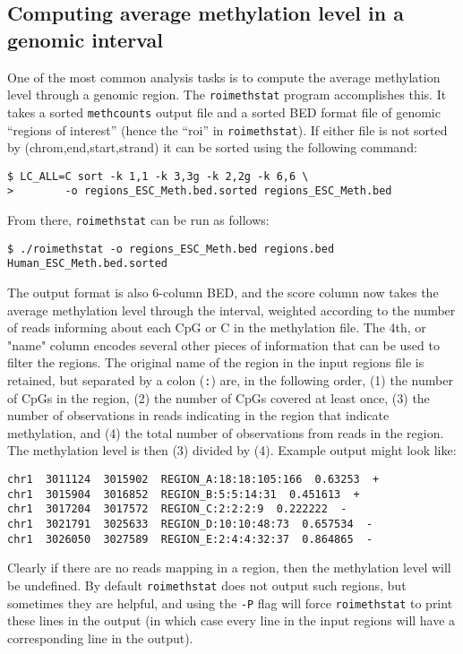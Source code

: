 \documentclass[10pt]{article}
\newcommand{\prog}[1]{\texttt{#1}}
\newcommand{\lit}[1]{\texttt{#1}}
\newcommand{\op}[1]{\texttt{#1}}
\begin{document}

\subsection{Computing average methylation level in a genomic interval}
\label{sec:roimethstat}

One of the most common analysis tasks is to compute the average
methylation level through a genomic region. The \prog{roimethstat}
program accomplishes this. It takes a sorted \prog{methcounts} output file
and a sorted BED format file of genomic ``regions of interest'' (hence the
``roi'' in \prog{roimethstat}).  If either file is not sorted by (chrom,end,start,strand)
it can be sorted using the following command:
\begin{verbatim}
$ LC_ALL=C sort -k 1,1 -k 3,3g -k 2,2g -k 6,6 \
>        -o regions_ESC_Meth.bed.sorted regions_ESC_Meth.bed
\end{verbatim}
From there, \prog{roimethstat} can be run as follows:
\begin{verbatim}
$ ./roimethstat -o regions_ESC_Meth.bed regions.bed Human_ESC_Meth.bed.sorted
\end{verbatim}
The output format is also 6-column BED, and the score column now takes
the average methylation level through the interval, weighted according
to the number of reads informing about each CpG or C in the
methylation file. The 4th, or "name" column encodes several other
pieces of information that can be used to filter the regions. The
original name of the region in the input regions file is retained, but
separated by a colon (\lit{:}) are, in the following order, (1) the
number of CpGs in the region, (2) the number of CpGs covered at least
once, (3) the number of observations in reads indicating in the region
that indicate methylation, and (4) the total number of observations
from reads in the region. The methylation level is then (3) divided by
(4). Example output might look like:
\begin{verbatim}
chr1  3011124  3015902  REGION_A:18:18:105:166  0.63253  +
chr1  3015904  3016852  REGION_B:5:5:14:31  0.451613  +
chr1  3017204  3017572  REGION_C:2:2:2:9  0.222222  -
chr1  3021791  3025633  REGION_D:10:10:48:73  0.657534  -
chr1  3026050  3027589  REGION_E:2:4:4:32:37  0.864865  -
\end{verbatim}
Clearly if there are no reads mapping in a region, then the
methylation level will be undefined. By default \prog{roimethstat}
does not output such regions, but sometimes they are helpful, and
using the \op{-P} flag will force \prog{roimethstat} to print these
lines in the output (in which case every line in the input regions
will have a corresponding line in the output).
\end{document}
